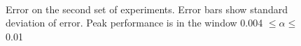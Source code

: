 \documentclass[a4paper,11pt]{article}
\begin{document}
\begin{center}
\begin{figure}
\\
\caption{Error on the second set of experiments. Error bars show
standard deviation of error. Peak performance is in the window 0.004
$\leq\alpha\leq$ 0.01}
\label{fig:fineerror}
\end{figure}
\end{center}
\end{document}
